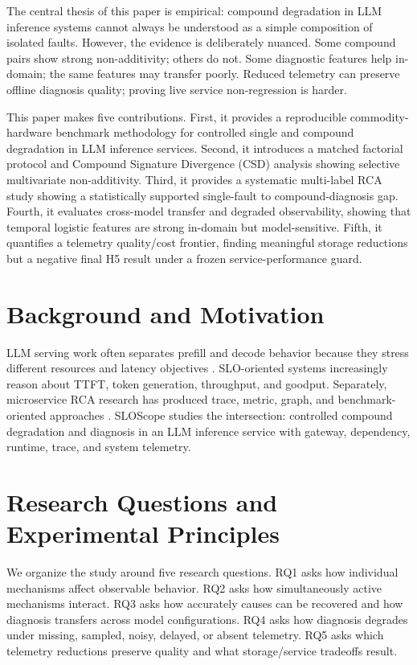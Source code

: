 \documentclass[11pt]{article}
\begin{document}
The central thesis of this paper is empirical: compound degradation in LLM inference systems cannot always be understood as a simple composition of isolated faults. However, the evidence is deliberately nuanced. Some compound pairs show strong non-additivity; others do not. Some diagnostic features help in-domain; the same features may transfer poorly. Reduced telemetry can preserve offline diagnosis quality; proving live service non-regression is harder.

This paper makes five contributions. First, it provides a reproducible commodity-hardware benchmark methodology for controlled single and compound degradation in LLM inference services. Second, it introduces a matched factorial protocol and Compound Signature Divergence (CSD) analysis showing selective multivariate non-additivity. Third, it provides a systematic multi-label RCA study showing a statistically supported single-fault to compound-diagnosis gap. Fourth, it evaluates cross-model transfer and degraded observability, showing that temporal logistic features are strong in-domain but model-sensitive. Fifth, it quantifies a telemetry quality/cost frontier, finding meaningful storage reductions but a negative final H5 result under a frozen service-performance guard.

\section{Background and Motivation}
LLM serving work often separates prefill and decode behavior because they stress different resources and latency objectives \cite{distserve2024,sarathi2024}. SLO-oriented systems increasingly reason about TTFT, token generation, throughput, and goodput. Separately, microservice RCA research has produced trace, metric, graph, and benchmark-oriented approaches \cite{microRCA2020,rcaeval2025}. SLOScope studies the intersection: controlled compound degradation and diagnosis in an LLM inference service with gateway, dependency, runtime, trace, and system telemetry.

\section{Research Questions and Experimental Principles}
We organize the study around five research questions. RQ1 asks how individual mechanisms affect observable behavior. RQ2 asks how simultaneously active mechanisms interact. RQ3 asks how accurately causes can be recovered and how diagnosis transfers across model configurations. RQ4 asks how diagnosis degrades under missing, sampled, noisy, delayed, or absent telemetry. RQ5 asks which telemetry reductions preserve quality and what storage/service tradeoffs result.
\end{document}
